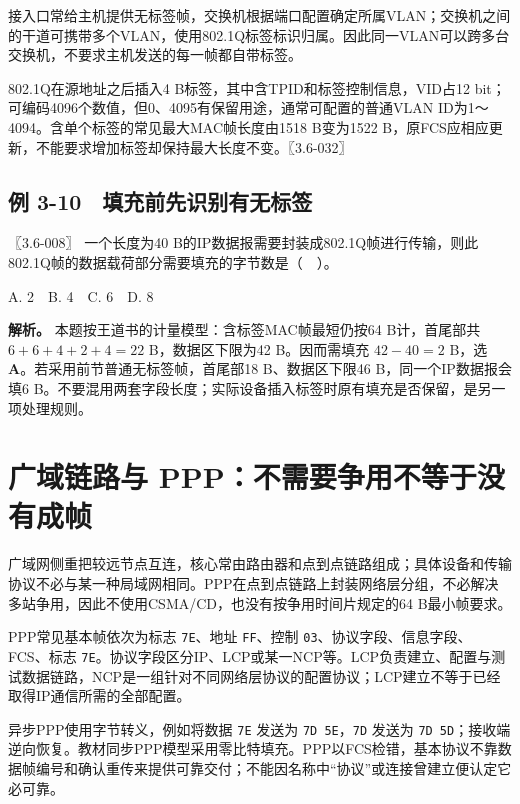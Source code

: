 接入口常给主机提供无标签帧，交换机根据端口配置确定所属VLAN；交换机之间的干道可携带多个VLAN，使用802.1Q标签标识归属。因此同一VLAN可以跨多台交换机，不要求主机发送的每一帧都自带标签。

802.1Q在源地址之后插入4 B标签，其中含TPID和标签控制信息，VID占12 bit；可编码4096个数值，但0、4095有保留用途，通常可配置的普通VLAN ID为1～4094。含单个标签的常见最大MAC帧长度由1518 B变为1522 B，原FCS应相应更新，不能要求增加标签却保持最大长度不变。〖3.6-032〗

\subsection{例 3-10　填充前先识别有无标签}\label{CN03-ex10}

{\begin{example}[配套例题]

〖3.6-008〗 一个长度为40 B的IP数据报需要封装成802.1Q帧进行传输，则此802.1Q帧的数据载荷部分需要填充的字节数是（　）。

A. 2　B. 4　C. 6　D. 8

\end{example}}

\textbf{解析。} 本题按王道书的计量模型：含标签MAC帧最短仍按64 B计，首尾部共 \(6+6+4+2+4=22\) B，数据区下限为42 B。因而需填充 \(42-40=2\) B，选 \textbf{A}。若采用前节普通无标签帧，首尾部18 B、数据区下限46 B，同一个IP数据报会填6 B。不要混用两套字段长度；实际设备插入标签时原有填充是否保留，是另一项处理规则。

\section{广域链路与 PPP：不需要争用不等于没有成帧}\label{CN03-18}

广域网侧重把较远节点互连，核心常由路由器和点到点链路组成；具体设备和传输协议不必与某一种局域网相同。PPP在点到点链路上封装网络层分组，不必解决多站争用，因此不使用CSMA/CD，也没有按争用时间片规定的64 B最小帧要求。

PPP常见基本帧依次为标志 \texttt{7E}、地址 \texttt{FF}、控制 \texttt{03}、协议字段、信息字段、FCS、标志 \texttt{7E}。协议字段区分IP、LCP或某一NCP等。LCP负责建立、配置与测试数据链路，NCP是一组针对不同网络层协议的配置协议；LCP建立不等于已经取得IP通信所需的全部配置。

异步PPP使用字节转义，例如将数据 \texttt{7E} 发送为 \texttt{7D 5E}，\texttt{7D} 发送为 \texttt{7D 5D}；接收端逆向恢复。教材同步PPP模型采用零比特填充。PPP以FCS检错，基本协议不靠数据帧编号和确认重传来提供可靠交付；不能因名称中``协议''或连接曾建立便认定它必可靠。

